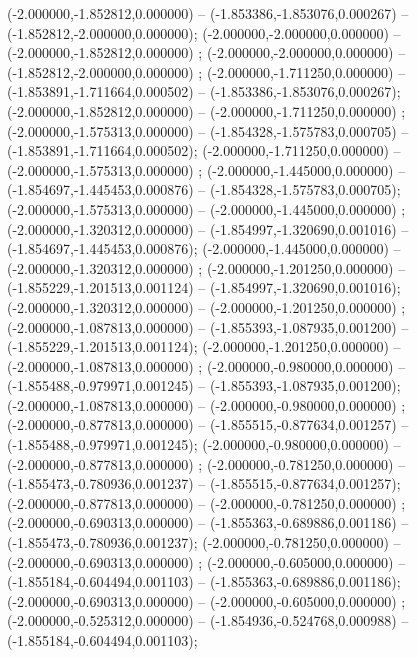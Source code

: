  (-2.000000,-1.852812,0.000000) -- (-1.853386,-1.853076,0.000267) -- (-1.852812,-2.000000,0.000000);
 (-2.000000,-2.000000,0.000000) -- (-2.000000,-1.852812,0.000000) ;
 (-2.000000,-2.000000,0.000000) -- (-1.852812,-2.000000,0.000000) ;
 (-2.000000,-1.711250,0.000000) -- (-1.853891,-1.711664,0.000502) -- (-1.853386,-1.853076,0.000267);
 (-2.000000,-1.852812,0.000000) -- (-2.000000,-1.711250,0.000000) ;
 (-2.000000,-1.575313,0.000000) -- (-1.854328,-1.575783,0.000705) -- (-1.853891,-1.711664,0.000502);
 (-2.000000,-1.711250,0.000000) -- (-2.000000,-1.575313,0.000000) ;
 (-2.000000,-1.445000,0.000000) -- (-1.854697,-1.445453,0.000876) -- (-1.854328,-1.575783,0.000705);
 (-2.000000,-1.575313,0.000000) -- (-2.000000,-1.445000,0.000000) ;
 (-2.000000,-1.320312,0.000000) -- (-1.854997,-1.320690,0.001016) -- (-1.854697,-1.445453,0.000876);
 (-2.000000,-1.445000,0.000000) -- (-2.000000,-1.320312,0.000000) ;
 (-2.000000,-1.201250,0.000000) -- (-1.855229,-1.201513,0.001124) -- (-1.854997,-1.320690,0.001016);
 (-2.000000,-1.320312,0.000000) -- (-2.000000,-1.201250,0.000000) ;
 (-2.000000,-1.087813,0.000000) -- (-1.855393,-1.087935,0.001200) -- (-1.855229,-1.201513,0.001124);
 (-2.000000,-1.201250,0.000000) -- (-2.000000,-1.087813,0.000000) ;
 (-2.000000,-0.980000,0.000000) -- (-1.855488,-0.979971,0.001245) -- (-1.855393,-1.087935,0.001200);
 (-2.000000,-1.087813,0.000000) -- (-2.000000,-0.980000,0.000000) ;
 (-2.000000,-0.877813,0.000000) -- (-1.855515,-0.877634,0.001257) -- (-1.855488,-0.979971,0.001245);
 (-2.000000,-0.980000,0.000000) -- (-2.000000,-0.877813,0.000000) ;
 (-2.000000,-0.781250,0.000000) -- (-1.855473,-0.780936,0.001237) -- (-1.855515,-0.877634,0.001257);
 (-2.000000,-0.877813,0.000000) -- (-2.000000,-0.781250,0.000000) ;
 (-2.000000,-0.690313,0.000000) -- (-1.855363,-0.689886,0.001186) -- (-1.855473,-0.780936,0.001237);
 (-2.000000,-0.781250,0.000000) -- (-2.000000,-0.690313,0.000000) ;
 (-2.000000,-0.605000,0.000000) -- (-1.855184,-0.604494,0.001103) -- (-1.855363,-0.689886,0.001186);
 (-2.000000,-0.690313,0.000000) -- (-2.000000,-0.605000,0.000000) ;
 (-2.000000,-0.525312,0.000000) -- (-1.854936,-0.524768,0.000988) -- (-1.855184,-0.604494,0.001103);
